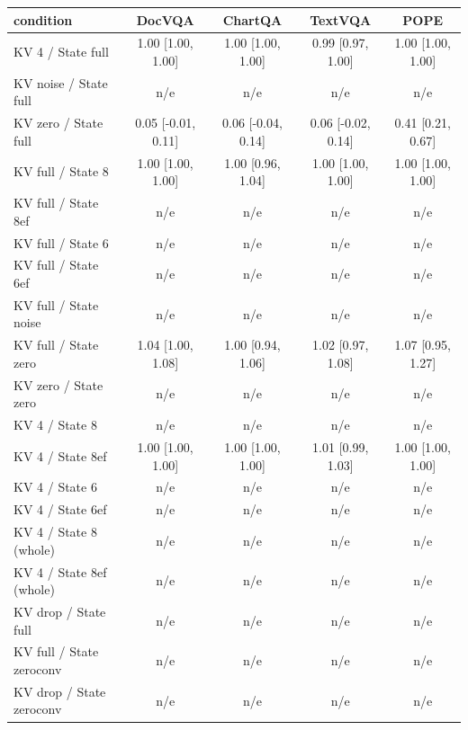 \begin{tabular}{lcccc}
\toprule
condition & DocVQA & ChartQA & TextVQA & POPE \\
\midrule
KV 4 / State full & 1.00 {\scriptsize[1.00, 1.00]} & 1.00 {\scriptsize[1.00, 1.00]} & 0.99 {\scriptsize[0.97, 1.00]} & 1.00 {\scriptsize[1.00, 1.00]} \\
KV noise / State full & n/e & n/e & n/e & n/e \\
KV zero / State full & 0.05 {\scriptsize[-0.01, 0.11]} & 0.06 {\scriptsize[-0.04, 0.14]} & 0.06 {\scriptsize[-0.02, 0.14]} & 0.41 {\scriptsize[0.21, 0.67]} \\
KV full / State 8 & 1.00 {\scriptsize[1.00, 1.00]} & 1.00 {\scriptsize[0.96, 1.04]} & 1.00 {\scriptsize[1.00, 1.00]} & 1.00 {\scriptsize[1.00, 1.00]} \\
KV full / State 8ef & n/e & n/e & n/e & n/e \\
KV full / State 6 & n/e & n/e & n/e & n/e \\
KV full / State 6ef & n/e & n/e & n/e & n/e \\
KV full / State noise & n/e & n/e & n/e & n/e \\
KV full / State zero & 1.04 {\scriptsize[1.00, 1.08]} & 1.00 {\scriptsize[0.94, 1.06]} & 1.02 {\scriptsize[0.97, 1.08]} & 1.07 {\scriptsize[0.95, 1.27]} \\
KV zero / State zero & n/e & n/e & n/e & n/e \\
KV 4 / State 8 & n/e & n/e & n/e & n/e \\
KV 4 / State 8ef & 1.00 {\scriptsize[1.00, 1.00]} & 1.00 {\scriptsize[1.00, 1.00]} & 1.01 {\scriptsize[0.99, 1.03]} & 1.00 {\scriptsize[1.00, 1.00]} \\
KV 4 / State 6 & n/e & n/e & n/e & n/e \\
KV 4 / State 6ef & n/e & n/e & n/e & n/e \\
KV 4 / State 8 (whole) & n/e & n/e & n/e & n/e \\
KV 4 / State 8ef (whole) & n/e & n/e & n/e & n/e \\
KV drop / State full & n/e & n/e & n/e & n/e \\
KV full / State zeroconv & n/e & n/e & n/e & n/e \\
KV drop / State zeroconv & n/e & n/e & n/e & n/e \\
\bottomrule
\end{tabular}
